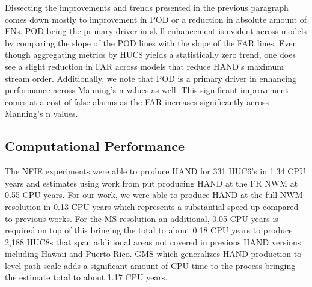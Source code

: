 Dissecting the improvements and trends presented in the previous paragraph comes down mostly to improvement in POD or a reduction in absolute amount of FNs.
POD being the primary driver in skill enhancement is evident across models by comparing the slope of the POD lines with the slope of the FAR lines.
Even though aggregating metrics by HUC8 yields a statistically zero trend, one does see a slight reduction in FAR across models that reduce HAND's maximum stream order.
Additionally, we note that POD is a primary driver in enhancing performance across Manning's n values as well.
This significant improvement comes at a cost of false alarms as the FAR increases significantly across Manning's n values.
%
\subsection{Computational Performance}
\label{ssec:compuational_performance}
%
The NFIE experiments were able to produce HAND for 331 HUC6's in 1.34 CPU years \cite{liu2016cybergis} and estimates using work from  put producing HAND at the FR NWM at 0.55 CPU years. 
For our work, we were able to produce HAND at the full NWM resolution in 0.13 CPU years which represents a substantial speed-up compared to previous works.
For the MS resolution an additional, 0.05 CPU years is required on top of this bringing the total to about 0.18 CPU years to produce 2,188 HUC8s that span additional areas not covered in previous HAND versions including Hawaii and Puerto Rico.
GMS which generalizes HAND production to level path scale adds a significant amount of CPU time to the process bringing the estimate total to about 1.17 CPU years.
%
